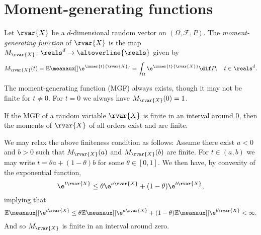 \documentclass[article, a4paper, 11pt, oneside]{memoir}
\title{\doctitle}
\author{\docauthor}
\numberwithin{equation}{chapter}
\newcommand{\calF}{\mathcal{F}}
\begin{document}
\maketitle

\chapter{Moment-generating functions}

\newcommand{\Rbar}{\altoverline{\reals}}

\begin{definition}
    Let $\rvar{X}$ be a $d$-dimensional random vector on $(\Omega, \calF, P)$. The \emph{moment-generating function} of $\rvar{X}$ is the map $M_{\rvar{X}} \colon \reals^d \to \Rbar$ given by
    \begin{equation*}
        M_{\rvar{X}}(t)
            = \mean{\e^{\inner{t}{\rvar{X}}}}
            = \int_{\Omega} \e^{\inner{t}{\rvar{X}}} \dif P,
            \quad t \in \reals^d.
    \end{equation*}
\end{definition}


\begin{remark}
    The moment-generating function (MGF) always exists, though it may not be finite for $t \neq 0$. For $t = 0$ we always have $M_{\rvar{X}}(0) = 1$.
\end{remark}


\begin{proposition}
    \label{thm:mgf_moments}
    If the MGF of a random variable $\rvar{X}$ is finite in an interval around $0$, then the moments of $\rvar{X}$ of all orders exist and are finite.
\end{proposition}

\begin{remark}
    We may relax the above finiteness condition as follows: Assume there exist $a < 0$ and $b > 0$ such that $M_{\rvar{X}}(a)$ and $M_{\rvar{X}}(b)$ are finite. For $t \in (a,b)$ we may write $t = \theta a + (1-\theta) b$ for some $\theta \in [0,1]$. We then have, by convexity of the exponential function,
    \begin{equation*}
        \e^{t\rvar{X}}
            \leq \theta \e^{a\rvar{X}} + (1-\theta) \e^{b\rvar{X}},
    \end{equation*}
    implying that
    \begin{equation*}
        \mean{\e^{t\rvar{X}}}
            \leq \theta \mean{\e^{a\rvar{X}}} + (1-\theta) \mean{\e^{b\rvar{X}}}
            < \infty.
    \end{equation*}
    And so $M_{\rvar{X}}$ is finite in an interval around zero.
\end{remark}
\end{document}
